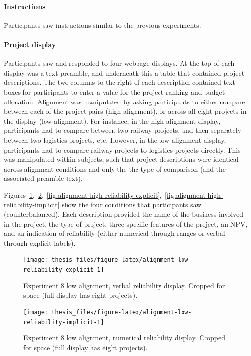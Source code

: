 \documentclass[a4paper, nobind, dvipsnames]{templates/ociamthesis}
\theoremstyle{definition}
\theoremstyle{definition}
\theoremstyle{definition}
\theoremstyle{definition}
\theoremstyle{remark}
\begin{document}
\paragraph{Instructions}

Participants saw instructions similar to the previous experiments.

\paragraph{Project display}

Participants saw and responded to four webpage displays. At the top of each
display was a text preamble, and underneath this a table that contained project
descriptions. The two columns to the right of each description contained text
boxes for participants to enter a value for the project ranking and budget
allocation. Alignment was manipulated by asking participants to either compare
between each of the project pairs (high alignment), or across all eight projects
in the display (low alignment). For instance, in the high alignment display,
participants had to compare between two railway projects, and then separately
between two logistics projects, etc. However, in the low alignment display,
participants had to compare railway projects to logistics projects directly.
This was manipulated within-subjects, such that project descriptions were
identical across alignment conditions and only the the type of comparison (and
the associated preamble text).

Figures~\ref{fig:alignment-low-reliability-explicit},~\ref{fig:alignment-low-reliability-implicit},~\ref{fig:alignment-high-reliability-explicit},~\ref{fig:alignment-high-reliability-implicit}
show the four conditions that participants saw (counterbalanced). Each
description provided the name of the business involved in the project, the type
of project, three specific features of the project, an NPV, and an indication of
reliability (either numerical through ranges or verbal through explicit labels).

\begin{figure}
\texttt{[image: thesis\_files/figure-latex/alignment-low-reliability-explicit-1]} \caption{Experiment 8 low alignment, verbal reliability display. Cropped for space (full display has eight projects).}\label{fig:alignment-low-reliability-explicit}
\end{figure}

\begin{figure}
\texttt{[image: thesis\_files/figure-latex/alignment-low-reliability-implicit-1]} \caption{Experiment 8 low alignment, numerical reliability display. Cropped for space (full display has eight projects).}\label{fig:alignment-low-reliability-implicit}
\end{figure}
\end{document}
